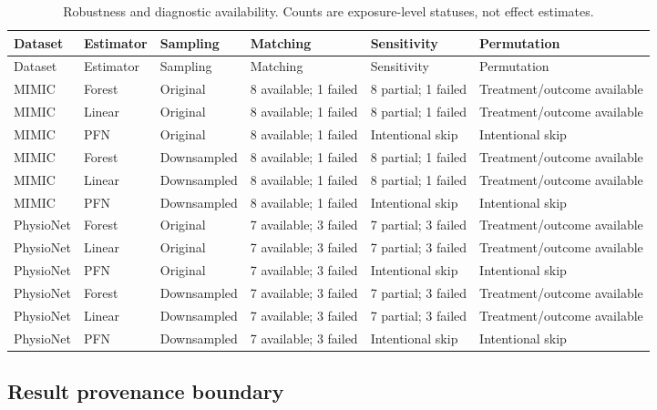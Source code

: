 \begingroup
\scriptsize
\setlength{\tabcolsep}{3pt}
\begin{longtable}{@{}lllL{0.20\textwidth}L{0.22\textwidth}L{0.18\textwidth}@{}}
\caption[Robustness and diagnostic availability.]{Robustness and diagnostic availability.  Counts are exposure-level statuses, not effect estimates.}
\label{tab:results-robustness-summary}\\
\toprule
Dataset & Estimator & Sampling & Matching & Sensitivity & Permutation \\
\midrule
\endfirsthead
\toprule
Dataset & Estimator & Sampling & Matching & Sensitivity & Permutation \\
\midrule
\endhead
MIMIC & Forest & Original & 8 available; 1 failed & 8 partial; 1 failed & Treatment/outcome available \\
MIMIC & Linear & Original & 8 available; 1 failed & 8 partial; 1 failed & Treatment/outcome available \\
MIMIC & PFN & Original & 8 available; 1 failed & Intentional skip & Intentional skip \\
MIMIC & Forest & Downsampled & 8 available; 1 failed & 8 partial; 1 failed & Treatment/outcome available \\
MIMIC & Linear & Downsampled & 8 available; 1 failed & 8 partial; 1 failed & Treatment/outcome available \\
MIMIC & PFN & Downsampled & 8 available; 1 failed & Intentional skip & Intentional skip \\
\addlinespace
PhysioNet & Forest & Original & 7 available; 3 failed & 7 partial; 3 failed & Treatment/outcome available \\
PhysioNet & Linear & Original & 7 available; 3 failed & 7 partial; 3 failed & Treatment/outcome available \\
PhysioNet & PFN & Original & 7 available; 3 failed & Intentional skip & Intentional skip \\
PhysioNet & Forest & Downsampled & 7 available; 3 failed & 7 partial; 3 failed & Treatment/outcome available \\
PhysioNet & Linear & Downsampled & 7 available; 3 failed & 7 partial; 3 failed & Treatment/outcome available \\
PhysioNet & PFN & Downsampled & 7 available; 3 failed & Intentional skip & Intentional skip \\
\bottomrule
\end{longtable}
\endgroup

\subsection{Result provenance boundary}

